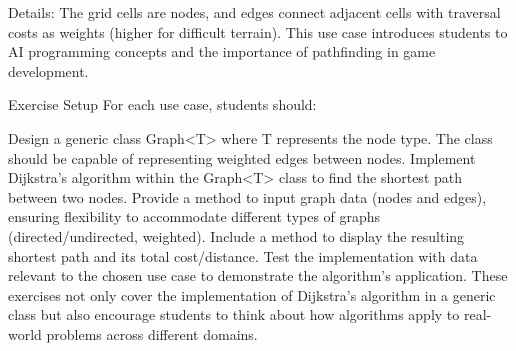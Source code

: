 Details: The grid cells are nodes, and edges connect adjacent cells with traversal costs as weights (higher for difficult terrain). This use case introduces students to AI programming concepts and the importance of pathfinding in game development.

Exercise Setup
For each use case, students should:

Design a generic class Graph<T> where T represents the node type. The class should be capable of representing weighted edges between nodes.
Implement Dijkstra's algorithm within the Graph<T> class to find the shortest path between two nodes.
Provide a method to input graph data (nodes and edges), ensuring flexibility to accommodate different types of graphs (directed/undirected, weighted).
Include a method to display the resulting shortest path and its total cost/distance.
Test the implementation with data relevant to the chosen use case to demonstrate the algorithm's application.
These exercises not only cover the implementation of Dijkstra's algorithm in a generic class but also encourage students to think about how algorithms apply to real-world problems across different domains.